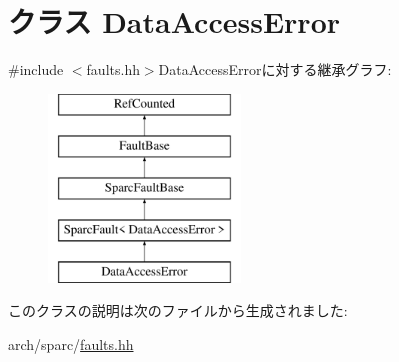 \hypertarget{classSparcISA_1_1DataAccessError}{
\section{クラス DataAccessError}
\label{classSparcISA_1_1DataAccessError}
}


{\ttfamily \#include $<$faults.hh$>$}DataAccessErrorに対する継承グラフ:\begin{figure}[H]
\begin{center}
\leavevmode
\includegraphics[height=5cm]{classSparcISA_1_1DataAccessError}
\end{center}
\end{figure}


このクラスの説明は次のファイルから生成されました:\begin{DoxyCompactItemize}
\item 
arch/sparc/\hyperlink{arch_2sparc_2faults_8hh}{faults.hh}\end{DoxyCompactItemize}

